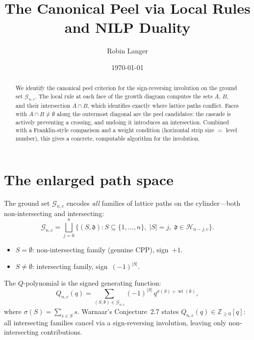 \documentclass[11pt]{article}
\title{The Canonical Peel via Local Rules \\
  and NILP Duality}
\author{Robin Langer}
\date{\today}
\newcommand{\Z}{\mathbb{Z}}
\DeclareMathOperator{\wt}{wt}
\theoremstyle{plain}
\theoremstyle{definition}
\begin{document}
\maketitle

\begin{abstract}
We identify the canonical peel criterion for the
sign-reversing involution on the ground set
$\mathcal{G}_{n,c}$.  The local rule at each face of
the growth diagram computes the sets $A$, $B$, and their
intersection $A \cap B$, which identifies exactly where
lattice paths conflict.  Faces with $A \cap B \neq \emptyset$
along the outermost diagonal are the peel candidates: the
cascade is actively preventing a crossing, and undoing
it introduces an intersection.  Combined with a Franklin-style
comparison and a weight condition (horizontal strip size
$=$ level number), this gives a concrete, computable
algorithm for the involution.
\end{abstract}

\tableofcontents


\section{The enlarged path space}
\label{sec:enlarged}

The ground set $\mathcal{G}_{n,c}$ encodes \emph{all}
families of lattice paths on the cylinder---both
non-intersecting and intersecting:
\begin{equation}\label{eq:ground-set}
  \mathcal{G}_{n,c}
  = \bigsqcup_{j=0}^{n}
    \bigl\{(S, \mathfrak{d}) :
      S \subseteq \{1, \ldots, n\},\;
      |S| = j,\;
      \mathfrak{d} \in \mathcal{H}_{n-j,c}
    \bigr\}.
\end{equation}
\begin{itemize}
  \item $S = \emptyset$: non-intersecting family
    (genuine CPP), sign~$+1$.
  \item $S \neq \emptyset$: intersecting family,
    sign~$(-1)^{|S|}$.
\end{itemize}
The $Q$-polynomial is the signed generating function:
\begin{equation}\label{eq:Q-signed}
  Q_{n,c}(q)
  = \sum_{(S, \mathfrak{d}) \in \mathcal{G}_{n,c}}
    (-1)^{|S|}\, q^{\sigma(S) + \wt(\mathfrak{d})},
\end{equation}
where $\sigma(S) = \sum_{s \in S} s$.  Warnaar's
Conjecture~2.7 states $Q_{n,c}(q) \in \Z_{\geq 0}[q]$:
all intersecting families cancel via a sign-reversing
involution, leaving only non-intersecting contributions.
\end{document}
